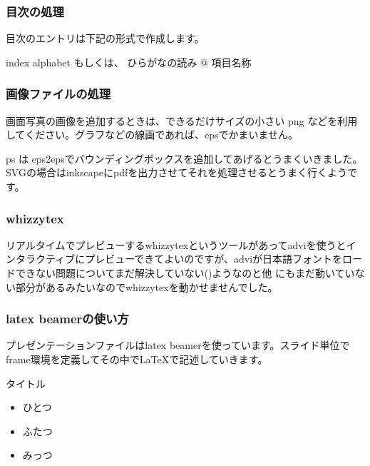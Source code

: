 \documentclass[mingoth,a4paper]{jsarticle}
\begin{document}
\subsubsection{目次の処理}

目次のエントリは下記の形式で作成します。
\begin{commandline}
index { alphabet もしくは、 ひらがなの読み @ 項目名称 } 
\end{commandline}

\subsubsection{画像ファイルの処理}

画面写真の画像を追加するときは、できるだけサイズの小さい png などを利用
してください。グラフなどの線画であれば、epsでかまいません。

ps は eps2epsでバウンディングボックスを追加してあげるとうまくいきました。
SVGの場合はinkscapeにpdfを出力させてそれを処理させるとうまく行くようです。

\subsubsection{whizzytex}

リアルタイムでプレビューするwhizzytexというツールがあってadviを使うとイ
ンタラクティブにプレビューできてよいのですが、adviが日本語フォントをロー
ドできない問題についてまだ解決していない()ようなのと他
にもまだ動いていない部分があるみたいなのでwhizzytexを動かせませんでした。

\subsubsection{latex beamerの使い方}

プレゼンテーションファイルはlatex beamerを使っています。スライド単位で
frame環境を定義してその中でLaTeXで記述していきます。

\begin{commandline}
\begin{frame}{タイトル}
  \begin{itemize}
  \item ひとつ
  \item ふたつ
  \item みっつ
  \end{itemize}
\end{frame}
\end{commandline}
\end{document}

